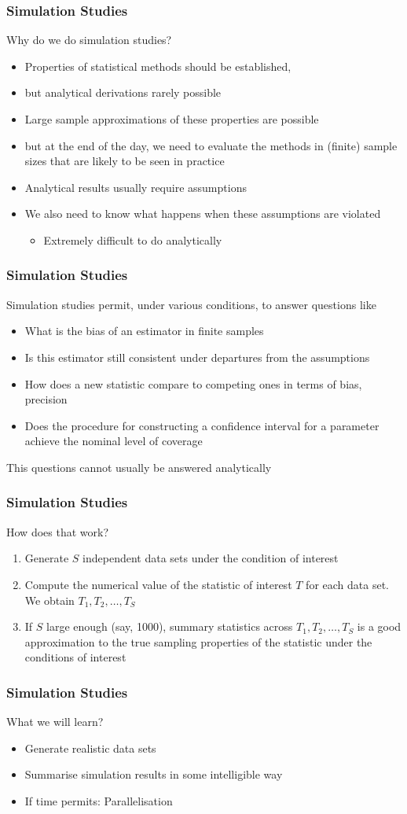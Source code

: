 \documentclass[paper=screen,mathserif]{beamer}\usepackage[]{graphicx}\usepackage[]{color}
\begin{document}
\begin{frame}
  \frametitle{Simulation Studies}
  Why do we do simulation studies?
  \begin{itemize}
  \item Properties of statistical methods should be established,
  \item but analytical derivations rarely possible
  \item Large sample approximations of these properties are possible
  \item but at the end of the day, we need to evaluate the methods in
    (finite) sample sizes that are likely to be seen in practice
  \item Analytical results usually require assumptions
  \item We also need to know what happens when these assumptions are
    violated
    \begin{itemize}
    \item Extremely difficult to do analytically
    \end{itemize}
  \end{itemize}
\end{frame}

\begin{frame}
  \frametitle{Simulation Studies} Simulation studies permit, under
  various conditions, to answer questions like
  \begin{itemize}
  \item What is the bias of an estimator in finite samples
  \item Is this estimator still consistent under departures from the
    assumptions
  \item How does a new statistic compare to competing ones in terms of
    bias, precision
  \item Does the procedure for constructing a confidence interval for
    a parameter achieve the nominal level of coverage
  \end{itemize}
This questions cannot usually be answered analytically
\end{frame}

\begin{frame}
  \frametitle{Simulation Studies}
How does that work?
\begin{enumerate}
\item Generate $S$ independent data sets under the condition of interest
\item Compute the numerical value of the statistic of interest $T$ for
  each data set. We obtain $T_1, T_2, \dots, T_S$
\item If $S$ large enough (say, 1000), summary statistics across $T_1,
  T_2, \dots, T_S$ is a good approximation to the true sampling
  properties of the statistic under the conditions of interest
\end{enumerate}
\end{frame}

\begin{frame}
  \frametitle{Simulation Studies}
  What we will learn?
  \begin{itemize}
  \item Generate realistic data sets
  \item Summarise simulation results in some intelligible way
  \item If time permits: Parallelisation
  \end{itemize}
\end{frame}
\end{document}

